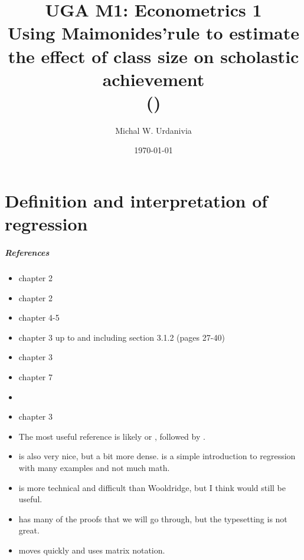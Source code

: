 


\title[Econometrics 1]{UGA M1: Econometrics 1\\
  \textbf{Using Maimonides'rule to estimate the effect of class size
    on scholastic achievement\\
(\cite{angrist1999})}}
\date{\today}
\author{Michal W. Urdanivia\inst{*}}




\frame{\titlepage}



\part{Definition and interpretation of regression}
\frame{\partpage}
\begin{frame}
  \tableofcontents  
\end{frame}

\begin{frame}[allowframebreaks]
  \frametitle{References}
  \begin{itemize}
  \item \cite{ap2014} chapter 2
  \item \cite{w2013} chapter 2    
  \item \cite{sw2009} chapter 4-5
  \item \cite{ap2009} chapter 3 up to and including section 3.1.2
    (pages 27-40)
  \item \cite{abbring2001} chapter 3
  \item \cite{dbc2012} chapter 7
  \item \cite{bierens2010sreg}
  \item \cite{baltagi2002} chapter 3
 \framebreak 
\item The most useful reference is likely \cite{w2013} or \cite{sw2009},
followed by \cite{ap2014}. 
\item \cite{ap2009} is also very nice, but a bit
more dense. \cite{dbc2012} is a simple introduction to regression with
many examples and not much math. 
\item \cite{baltagi2002}  is more technical and difficult than
Wooldridge, but I think would still be useful. 
\item  \cite{bierens2010sreg}
has many of the proofs that we will go through, but the typesetting is
not great.  
\item \cite{abbring2001} moves quickly and uses matrix
notation. 
\end{itemize}
\end{frame}

